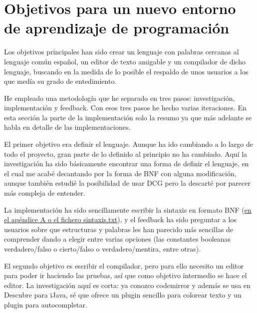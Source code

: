 \documentclass{report}
\begin{document}
	\section{Objetivos para un nuevo entorno de aprendizaje de programación}

	
	Los objetivos principales han sido crear un lenguaje con palabras cercanas al lenguaje común español, un editor de texto amigable y un compilador de dicho lenguaje, buscando en la medida de lo posible el respaldo de unos usuarios a los que medía su grado de entedimiento.
	
	\vspace{10px}
	
	He empleado una metodología que he separado en tres pasos: investigación, implementación y feedback. Con esos tres pasos he hecho varias iteraciones. En esta sección la parte de la implementación solo la resumo ya que más adelante se habla en detalle de las implementaciones.
	
	\vspace{10px}
	
	El primer objetivo era definir el lenguaje. Aunque ha ido cambiando a lo largo de todo el proyecto, gran parte de lo definido al principio no ha cambiado. Aquí la investigación ha sido básicamente encontrar una forma de definir el lenguaje, en el cual me acabé decantando por la forma de BNF\cite{bnf} con alguna modificación, aunque también estudié la posibilidad de usar DCG\cite{dcg} pero la descarté por parecer más compleja de entender. 
	
	La implementación ha sido sencillamente escribir la sintaxis en formato BNF (\hyperref[app:a]{en el apéndice A o el fichero sintaxis.txt}), y el feedback ha sido preguntar a los usuarios sobre que estructuras y palabras les han parecido más sencillas de comprender dando a elegir entre varias opciones (las constantes booleanas verdadero/falso o cierto/falso o verdadero/mentira, entre otras).
	
	\vspace{10px}
	
	El segundo objetivo es escribir el compilador, pero para ello necesito un editor para poder ir haciendo las pruebas, así que como objetivo intermedio se hace el editor. La investigación aquí es corta: ya conozco codemirror y además se usa en Descubre para iJava, sé que ofrece un plugin sencillo para colorear texto\cite{codemirrorsyntaxhighlight} y un plugin para autocompletar\cite{codemirrorautocomplete}. 
	
\end{document}
